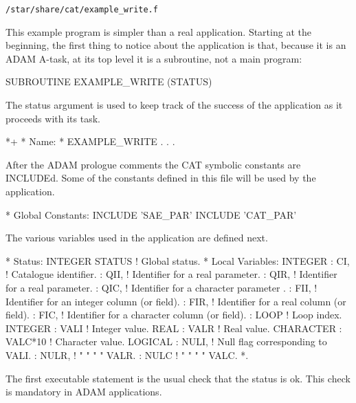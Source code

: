 \documentclass[11pt,twoside]{starlink}
\begin{document}
\begin{center}
\texttt{/star/share/cat/example\_write.f}
\end{center}

This example program is simpler than a real application. Starting at the
beginning, the first thing to notice about the application is that,
because it is an ADAM A-task, at its top level it is a subroutine, not
a main program:

\begin{terminalv}
      SUBROUTINE EXAMPLE_WRITE (STATUS)
\end{terminalv}

The status argument is used to keep track of the success of the
application as it proceeds with its task.

\begin{terminalv}
*+
*  Name:
*     EXAMPLE_WRITE
    .
    .
    .
\end{terminalv}

After the ADAM prologue comments the CAT symbolic constants are
INCLUDEd. Some of the constants defined in this file will be used by
the application.

\begin{terminalv}
*  Global Constants:
      INCLUDE 'SAE_PAR'
      INCLUDE 'CAT_PAR'
\end{terminalv}

The various variables used in the application are defined next.

\begin{terminalv}
*  Status:
      INTEGER STATUS             ! Global status.
*  Local Variables:
      INTEGER
     :  CI,       ! Catalogue identifier.
     :  QII,      ! Identifier for a real parameter.
     :  QIR,      ! Identifier for a real parameter.
     :  QIC,      ! Identifier for a character parameter .
     :  FII,      ! Identifier for an integer column (or field).
     :  FIR,      ! Identifier for a real column (or field).
     :  FIC,      ! Identifier for a character column (or field).
     :  LOOP      ! Loop index.
      INTEGER
     :  VALI      ! Integer value.
      REAL
     :  VALR      ! Real value.
      CHARACTER
     :  VALC*10   ! Character value.
      LOGICAL
     :  NULI,     ! Null flag corresponding to VALI.
     :  NULR,     !  "    "         "       "  VALR.
     :  NULC      !  "    "         "       "  VALC.
*.
\end{terminalv}

The first executable statement is the usual check that the status is ok.
This check is mandatory in ADAM applications.
\end{document}
